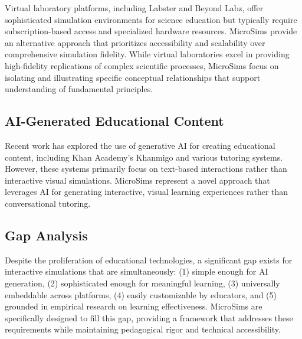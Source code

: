 Virtual laboratory platforms, including Labster and Beyond Labz, offer sophisticated simulation environments for science education but typically require subscription-based access and specialized hardware resources. MicroSims provide an alternative approach that prioritizes accessibility and scalability over comprehensive simulation fidelity. While virtual laboratories excel in providing high-fidelity replications of complex scientific processes, MicroSims focus on isolating and illustrating specific conceptual relationships that support understanding of fundamental principles.

\subsection{AI-Generated Educational Content}

Recent work has explored the use of generative AI for creating educational content, including Khan Academy's Khanmigo \cite{khanacademy2023} and various tutoring systems. However, these systems primarily focus on text-based interactions rather than interactive visual simulations. MicroSims represent a novel approach that leverages AI for generating interactive, visual learning experiences rather than conversational tutoring.

\subsection{Gap Analysis}

Despite the proliferation of educational technologies, a significant gap exists for interactive simulations that are simultaneously: (1) simple enough for AI generation, (2) sophisticated enough for meaningful learning, (3) universally embeddable across platforms, (4) easily customizable by educators, and (5) grounded in empirical research on learning effectiveness. MicroSims are specifically designed to fill this gap, providing a framework that addresses these requirements while maintaining pedagogical rigor and technical accessibility.
